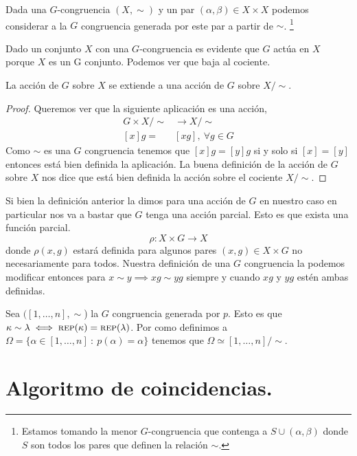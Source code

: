 \documentclass[tesis.tex]{subfiles}
\newcommand{\rep}{\textsc{rep}}
\begin{document}
\begin{deff}
	Dada una $G$-congruencia $(X, \sim)$ y un par $(\alpha, \beta) \in X \times X$ podemos considerar a la $G$ congruencia generada por este par a partir de $\sim$.
	\footnote{Estamos tomando la menor $G$-congruencia que contenga a $S \cup (\alpha, \beta)$ donde $S$ son todos los pares que definen la relación $\sim$.}
\end{deff}

Dado un conjunto $X$ con una $G$-congruencia es evidente que $G$ actúa en $X$ porque $X$ es un G conjunto. 
Podemos ver que baja al cociente.
\begin{lema}\label{lema-accion-GCong-cociente}
	La acción de $G$ sobre $X$ se extiende a una acción de $G$ sobre $X / \sim.$
\end{lema}
\begin{proof}
	Queremos ver que la siguiente aplicación es una acción,
	\begin{align*}
	G \times X/\sim &\to X/ \sim \\
	[x]g =& [xg], \ \forall g \in G
	\end{align*}
	 Como $\sim$ es una $G$ congruencia tenemos que $[x]g = [y]g$ si y solo si $[x] = [y]$ entonces está bien definida la aplicación.
	 La buena definición de la acción de $G$ sobre $X$ nos dice que está bien definida la acción sobre el cociente $X/\sim$.
\end{proof}

Si bien la definición anterior la dimos para una acción de $G$ en nuestro caso en particular nos va a bastar que $G$ tenga una acción parcial. 
Esto es que exista una función parcial.
\begin{equation*}
\rho: X \times G \to X
\end{equation*}
donde $\rho(x,g)$ estará definida para algunos pares $(x,g) \in X \times G$ no necesariamente para todos.
Nuestra definición de una $G$ congruencia la podemos modificar entonces para $x \sim y \implies xg \sim yg$ siempre y cuando $xg$ y $yg$ estén ambas definidas.





Sea $([1,\dots,n], \sim$) la $G$ congruencia generada por $p$. 
Esto es que $\kappa \sim \lambda \iff \rep(\kappa) = \rep (\lambda)$.
Por como definimos a $\Omega = \{  \alpha \in [1,\dots,n] \ : \ p(\alpha) = \alpha \}$ tenemos que $\Omega \simeq [1, \dots, n] / \sim$.

\section{Algoritmo de coincidencias.}
\end{document}
